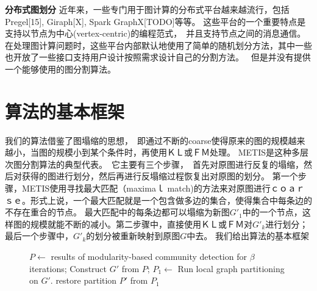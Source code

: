 \documentclass[master]{njuthesis}
\begin{document}
\textbf{分布式图划分} 近年来，一些专门用于图计算的分布式平台越来越流行，包括Pregel[15], Giraph[X], Spark GraphX[TODO]等等。
这些平台的一个重要特点是支持以节点为中心(vertex-centric)的编程范式，　并且支持节点之间的消息通信。　
在处理图计算问题时，这些平台内部默认地使用了简单的随机划分方法，其中一些也开放了一些接口支持用户设计按照需求设计自己的分割方法。　
但是并没有提供一个能够使用的图分割算法。

\section{算法的基本框架}
我们的算法借鉴了图塌缩的思想，　即通过不断的coarse使得原来的图的规模越来越小，当图的规模小到某个条件时，再使用ＫＬ或ＦＭ处理。
METIS是这种多层次图分割算法的典型代表。　它主要有三个步骤，　首先对原图进行反复的塌缩，然后对获得的图进行划分，然后再进行反塌缩过程恢复出对原图的划分。
第一个步骤，METIS使用寻找最大匹配（maximaｌ match)的方法来对原图进行ｃｏａｒｓｅ。形式上说，一个最大匹配就是一个包含做多边的集合，使得集合中每条边的不存在重合的节点。
最大匹配中的每条边都可以塌缩为新图$G\prime_1$中的一个节点，这样图的规模就能不断的减小。第二步骤中，直接使用ＫＬ或ＦＭ对$G\prime_k$进行划分；
最后一个步骤中，$G\prime_k$的划分被重新映射到原图$G$中去。
我们给出算法的基本框架
\begin{figure}
\begin{algorithm}[H]
\label{alg:mlgp}
\begin{algorithmic}[1]
		\State $P \gets $ results of modularity-based community detection for $\beta$ iterations;
		\State Construct $G\prime$ from $P$;
	\EndWhile
	\State $P_1 \gets $ Run local graph partitioning on $G\prime$. 
	\State restore partition $P\prime$ from $P_1$
\EndProcedure
\end{algorithmic}
\end{algorithm}
\end{figure}
\end{document}
